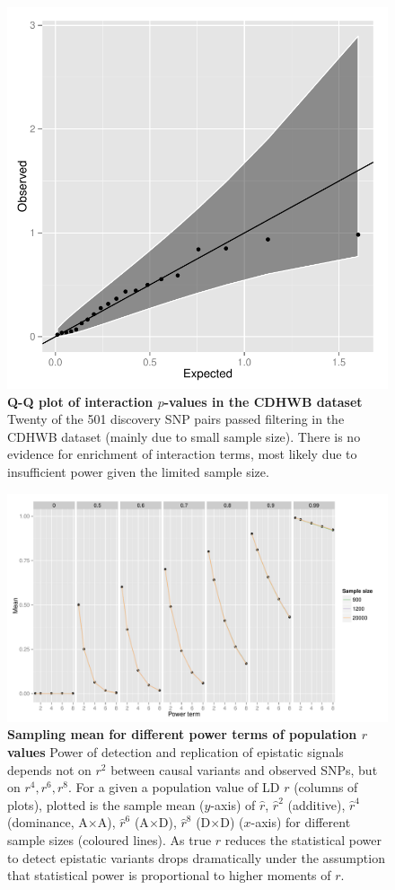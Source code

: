 \documentclass{article}
\begin{document}
\begin{figure}
	\centering
	\includegraphics[width=5in]{qqgg}
	\caption{\textbf{Q-Q plot of interaction $p$-values in the CDHWB dataset} Twenty of the 501 discovery SNP pairs passed filtering in the CDHWB dataset (mainly due to small sample size). There is no evidence for enrichment of interaction terms, most likely due to insufficient power given the limited sample size.}
	\label{fig:qqgg}
\end{figure}
\clearpage

\begin{figure}
	\centering
	\includegraphics[width=5in]{ld_sampling_mean}
	\caption{\textbf{Sampling mean for different power terms of population $r$ values} Power of detection and replication of epistatic signals depends not on $r^2$ between causal variants and observed SNPs, but on $r^4, r^6, r^8$. For a given a population value of LD $r$ (columns of plots), plotted is the sample mean ($y$-axis) of $\hat{r}$, $\hat{r}^2$ (additive), $\hat{r}^4$ (dominance, A$\times$A), $\hat{r}^6$ (A$\times$D), $\hat{r}^8$ (D$\times$D) ($x$-axis) for different sample sizes (coloured lines). As true $r$ reduces the statistical power to detect epistatic variants drops dramatically under the assumption that statistical power is proportional to higher moments of $r$.}
	\label{fig:ld_sampling_mean}
\end{figure}
\clearpage
\end{document}
